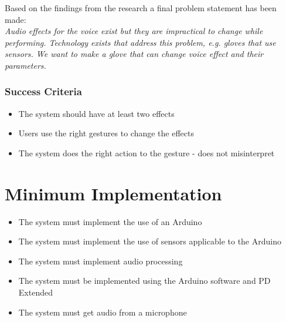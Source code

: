 Based on the findings from the research a final problem statement has been made:\\

\textit{Audio effects for the voice exist but they are impractical to change while performing. Technology exists that address this problem, e.g. gloves that use sensors. We want to make a glove that can change voice effect and their parameters.}

\subsubsection{Success Criteria}

\begin{itemize}
	\item The system should have at least two effects
	\item Users use the right gestures to change the effects
	\item The system does the right action to the gesture - does not misinterpret 
\end{itemize}



\section{Minimum Implementation}
\begin{itemize}
	\item The system must implement the use of an Arduino
	\item The system must implement the use of sensors applicable to the Arduino
	\item The system must implement audio processing
	\item The system must be implemented using the Arduino software and PD Extended
	\item The system must get audio from a microphone
\end{itemize}

